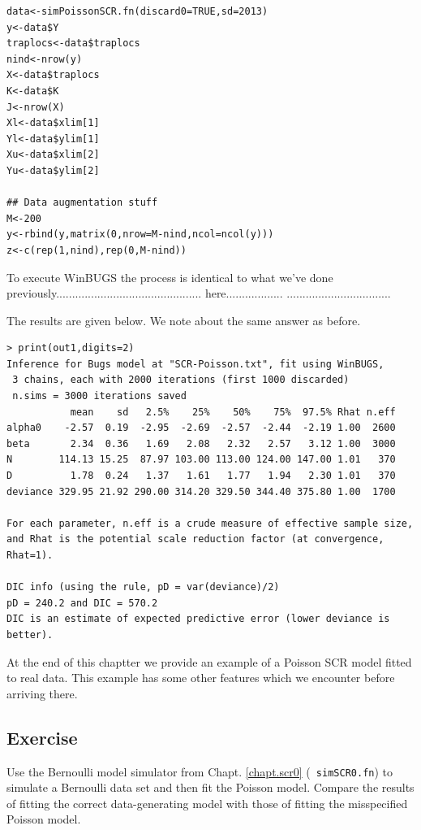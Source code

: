 \begin{verbatim}
data<-simPoissonSCR.fn(discard0=TRUE,sd=2013)
y<-data$Y
traplocs<-data$traplocs
nind<-nrow(y)
X<-data$traplocs
K<-data$K
J<-nrow(X)
Xl<-data$xlim[1]
Yl<-data$ylim[1]
Xu<-data$xlim[2]
Yu<-data$ylim[2]

## Data augmentation stuff
M<-200
y<-rbind(y,matrix(0,nrow=M-nind,ncol=ncol(y)))
z<-c(rep(1,nind),rep(0,M-nind))
\end{verbatim}

To execute WinBUGS the process is identical to what we've done
previously..............................................
here..................
.................................

The results are given below. We note about the same answer as before.

{\small
\begin{verbatim}
> print(out1,digits=2)
Inference for Bugs model at "SCR-Poisson.txt", fit using WinBUGS,
 3 chains, each with 2000 iterations (first 1000 discarded)
 n.sims = 3000 iterations saved
           mean    sd   2.5%    25%    50%    75%  97.5% Rhat n.eff
alpha0    -2.57  0.19  -2.95  -2.69  -2.57  -2.44  -2.19 1.00  2600
beta       2.34  0.36   1.69   2.08   2.32   2.57   3.12 1.00  3000
N        114.13 15.25  87.97 103.00 113.00 124.00 147.00 1.01   370
D          1.78  0.24   1.37   1.61   1.77   1.94   2.30 1.01   370
deviance 329.95 21.92 290.00 314.20 329.50 344.40 375.80 1.00  1700

For each parameter, n.eff is a crude measure of effective sample size,
and Rhat is the potential scale reduction factor (at convergence, Rhat=1).

DIC info (using the rule, pD = var(deviance)/2)
pD = 240.2 and DIC = 570.2
DIC is an estimate of expected predictive error (lower deviance is better).
\end{verbatim}


At the end of this chaptter we provide an example of a Poisson SCR model fitted to 
real data. This example has some other features which we encounter before
arriving there. 

\subsection{Exercise}

Use the Bernoulli model simulator from Chapt. \ref{chapt.scr0} (\mbox{\tt
  simSCR0.fn}) to simulate a Bernoulli data set and then fit the
Poisson model. Compare the results of fitting the correct
data-generating model with those of fitting the misspecified Poisson
model. 



}
